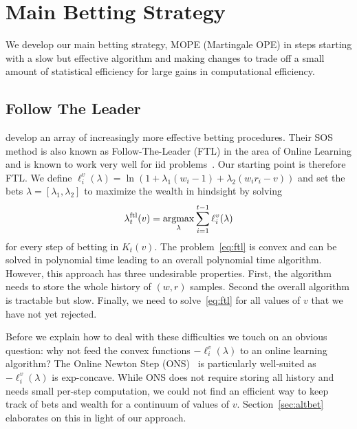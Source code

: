 \section{Main Betting Strategy}
We develop our main betting strategy, MOPE (Martingale OPE) 
in steps starting with a slow but effective algorithm 
and making changes to trade off a small amount of statistical
efficiency for large gains in computational efficiency.

\subsection{Follow The Leader}
\citet{waudby-smith_variance-adaptive_2020} develop an array of
increasingly more effective betting procedures.
Their SOS method is also known as Follow-The-Leader
(FTL) in the area of Online Learning and is known 
to work very well for iid problems~\cite{de2014follow}.
Our starting point is therefore FTL.
We define $\ell_i^v(\lambda)=\ln(1+\lambda_1 (w_i-1)+\lambda_2(w_i r_i -
v))$ and set the bets $\lambda = [\lambda_1, \lambda_2]$ to maximize the wealth in
hindsight by solving
\begin{equation}
\lambda_{t}^{\textrm{ftl}}(v) = \operatorname*{argmax}_{\lambda} \sum_{i=1}^{t-1}
\ell_{i}^{v}(\lambda)
\label{eq:ftl}
\end{equation}
for every step of betting in $K_t(v)$.  
The problem~\eqref{eq:ftl} is convex and can be solved in
polynomial time leading to an overall polynomial time algorithm. 
However, this approach has three undesirable properties. 
First, the algorithm needs to store
the whole history of $(w,r)$ samples. 
Second the overall algorithm is
tractable but slow.  
Finally, we need to solve~\eqref{eq:ftl} for all
values of $v$ that we have not yet rejected.

Before we explain how to deal with these difficulties
we touch on an obvious question: why not feed the 
convex functions $-\ell_i^v(\lambda)$ to an online 
learning algorithm? The Online Newton Step
(ONS)~\cite{hazan2007logarithmic}
is particularly well-suited
as $-\ell_i^v(\lambda)$ is exp-concave.
While ONS does not require storing all history and needs
small per-step computation, we could not find an 
efficient way to keep track of bets and 
wealth for a continuum of values of $v$. 
Section~\ref{sec:altbet} elaborates on this 
in light of our approach.

